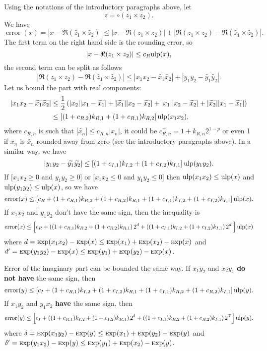 \documentclass {article}
\newcommand {\Ulp}{{\rm ulp}}
\DeclareMathOperator{\error}{error}
\DeclareMathOperator{\Exp}{{\rm \textsc exp}}
\begin{document}
Using the notations of the introductory paragraphs above, let
\[
z=\circ(z_1\times z_2).
\]
We have
\[
\error(x) = |x-\Re(\widetilde{z_1}\times \widetilde{z_2})| \leq
|x-\Re(z_1\times z_2)|
+|\Re(z_1\times z_2)-\Re(\widetilde{z_1}\times\widetilde{z_2})|.
\]
The first term on the right hand side is the rounding error, so
\[
|x-\Re(z_1\times z_2)| \leq c_R \Ulp(x),
\]
the second term can be split as follows
\[
|\Re(z_1\times z_2)-\Re(\widetilde{z_1}\times\widetilde{z_2})| \leq
|x_1x_2-\widetilde{x_1}\widetilde{x_2}|
+|y_1y_2-\widetilde{y_1}\widetilde{y_2}|.
\]
Let us bound the part with real components:
\begin{align*}
|x_1x_2-\widetilde{x_1}\widetilde{x_2}| &\leq
\frac{1}{2}\left(|x_2||x_1-\widetilde{x_1}|
+|\widetilde{x_1}||x_2-\widetilde{x_2}|+|x_1||x_2-\widetilde{x_2}|
+|\widetilde{x_2}||x_1-\widetilde{x_1}|\right)
\\
&\leq \left[(1+c_{R,2})k_{R,1}+(1+c_{R,1})k_{R,2}\right] \Ulp(x_1x_2),
\end{align*}
where $c_{R,n}$ is such that $|\widetilde{x_n}| \leq c_{R,n}|x_n|$, it could
be $c_{R,n}^+=1+k_{R,n}2^{1-p}$ or even 1 if $x_n$ is $\widetilde{x_n}$ rounded
away from zero (see the introductory paragraphs above). In a similar way, we
have
\[
|y_1y_2-\widetilde{y_1}\widetilde{y_2}| \leq
\left[(1+c_{I,1})k_{I,2}+(1+c_{I,2})k_{I,1}\right] \Ulp(y_1y_2).
\]
If [$x_1x_2 \geq 0$ and $y_1y_2 \geq 0$] or [$x_1x_2 \leq 0$ and $y_1y_2 \leq
  0$] then $\Ulp(x_1x_2) \leq \Ulp(x)$ and $\Ulp(y_1y_2) \leq \Ulp(x)$, so we
have
\[
\error(x) \leq \left[c_R + (1+c_{R,1})k_{R,2} + (1+c_{R,2})k_{R,1} +
(1+c_{I,1})k_{I,2} + (1+c_{I,2})k_{I,1} \right] \Ulp(x).
\]
If $x_1x_2$ and $y_1y_2$ don't have the same sign, then the inequality is
\[
\error(x) \leq \left[ c_R + \left( (1+c_{R,1})k_{R,2} + (1+c_{R,2})k_{R,1}
\right)2^d + \left( (1+c_{I,1})k_{I,2} + (1+c_{I,2})k_{I,1} \right)2^{d'}
\right] \Ulp(x)
\]
where $d = \Exp(x_1x_2)-\Exp(x) \leq \Exp(x_1)+\Exp(x_2)-\Exp(x)$ and $d' =
\Exp(y_1y_2)-\Exp(x) \leq \Exp(y_1)+\Exp(y_2)-\Exp(x)$.

Error of the imaginary part can be bounded the same way. If $x_1y_2$ and
$x_2y_1$ {\bf do not have} the same sign, then
\[
\error(y) \leq \left[c_I + (1+c_{R,1})k_{I,2} + (1+c_{I,2})k_{R,1} +
(1+c_{I,1})k_{R,2} + (1+c_{R,2})k_{I,1}\right] \Ulp(y).
\]
If $x_1y_2$ and $y_1x_2$ {\bf have} the same sign, then
\[
\error(y) \leq \left[c_I + \left( (1+c_{R,1})k_{I,2} + (1+c_{I,2})k_{R,1}
\right)2^{\delta} + \left( (1+c_{I,1})k_{R,2} + (1+c_{R,2})k_{I,1} \right)
2^{\delta'}\right] \Ulp(y).
\]
where $\delta = \Exp(x_1y_2)-\Exp(y) \leq \Exp(x_1)+\Exp(y_2)-\Exp(y)$ and
$\delta' = \Exp(y_1x_2)-\Exp(y) \leq \Exp(y_1)+\Exp(x_2)-\Exp(y)$.
\end{document}
